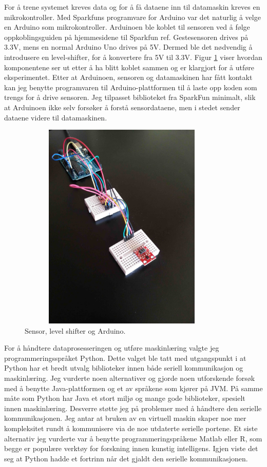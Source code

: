 For å trene systemet kreves data og for å få dataene inn til datamaskin kreves en mikrokontroller. Med Sparkfuns programvare for Arduino var det naturlig å velge en Arduino som mikrokontroller. Arduinoen ble koblet til sensoren ved å følge oppkoblingsguiden på hjemmesidene til Sparkfun {\color{red}ref}. Gestesensoren drives på 3.3V, mens en normal Arduino Uno drives på 5V. Dermed ble det nødvendig å introdusere en level-shifter, for å konvertere fra 5V til 3.3V. Figur \ref{fig:single-sensor} viser hvordan komponentene ser ut etter å ha blitt koblet sammen og er klargjort for å utføre eksperimentet. Etter at Arduinoen, sensoren og datamaskinen har fått kontakt kan jeg benytte programvaren til Arduino-plattformen til å laste opp koden som trengs for å drive sensoren. Jeg tilpasset biblioteket fra SparkFun minimalt, slik at Arduinoen ikke selv forsøker å forstå sensordataene, men i stedet sender dataene videre til datamaskinen.
\begin{figure}[h]
\centering
\includegraphics[width=10cm, height=10cm]{fig/singlesensor}
\caption{Sensor, level shifter og Arduino.}
\label{fig:single-sensor}
\end{figure}
For å håndtere dataprosesseringen og utføre maskinlæring valgte jeg programmeringsspråket Python. Dette valget ble tatt med utgangspunkt i at Python har et bredt utvalg biblioteker innen både seriell kommunikasjon og maskinlæring. Jeg vurderte noen alternativer og gjorde noen utforskende forsøk med å benytte Java-plattformen og et av språkene som kjører på JVM. På samme måte som Python har Java et stort miljø og mange gode biblioteker, spesielt innen maskinlæring. Desverre støtte jeg på problemer med å håndtere den serielle kommunikasjonen. Jeg antar at bruken av en virtuell maskin skaper noe mer kompleksitet rundt å kommunisere via de noe utdaterte serielle portene. Et siste alternativ jeg vurderte var å benytte programmeringspråkene Matlab eller R, som begge er populære verktøy for forskning innen kunstig intelligens. Igjen viste det seg at Python hadde et fortrinn når det gjaldt den serielle kommunikasjonen.

